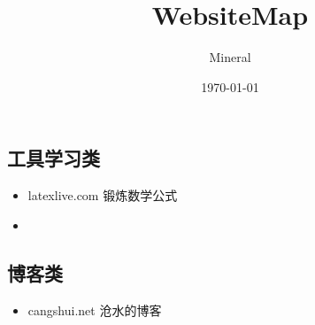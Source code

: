 \documentclass[utf8]{ctexart}
\author{Mineral}
\title{WebsiteMap}
\date {\today}
\begin{document}
		\maketitle
		\subsection{工具学习类}
		\begin{itemize}
				\item latexlive.com 锻炼数学公式
				\item 	
		\end{itemize}
		\subsection{博客类}
		\begin{itemize}
				\item cangshui.net 沧水的博客
		\end{itemize}
\end{document}
